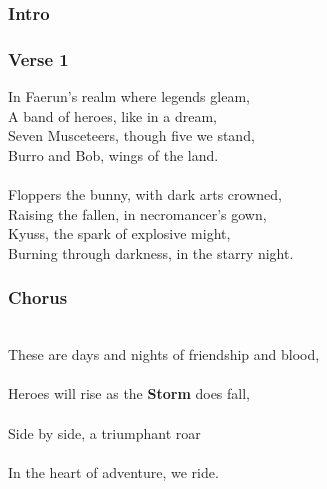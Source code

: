 \documentclass[letterpaper,openany,oneside,twocolumn]{book}
\begin{document}
\subsubsection*{Intro}
   

\subsubsection*{Verse 1}
{\entryfont In Faerun's realm where legends gleam,}\\
A band of heroes, like in a dream,\\
Seven Musceteers, though five we stand,\\
Burro and Bob, wings of the land.\\
\\
Floppers the bunny, with dark arts crowned,\\
Raising the fallen, in necromancer's gown,\\
Kyuss, the spark of explosive might,\\
Burning through darkness, in the starry night.

\subsubsection*{Chorus}
\hspace*{1.5cm}\hspace*{0.9cm}\hspace*{1cm}\hspace*{1.8cm}\\
{\entryfont These are days and nights of friendship and blood,}\\
\hspace*{1.1cm}\hspace*{1.3cm}\hspace*{1.3cm}\\
{\entryfont Heroes will rise as the \textbf{Storm} does fall,}\\
\hspace*{0.85cm}\hspace*{0.4cm}\hspace*{1.3cm}\\
{\entryfont Side by side, a triumphant roar}\\
\hspace*{1.1cm}\hspace*{0.4cm}\hspace*{1.9cm}\\
{\entryfont In the heart of adventure, we ride.}
\end{document}
